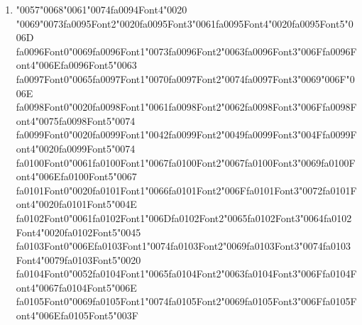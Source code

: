 \documentclass[11pt]{article}
\begin{document}
\begin{enumerate}[label=Q\arabic*., leftmargin=*]
\textbf{A.} Part-of-speech tagging

\textbf{B.} Named Entity Recognition

\textbf{C.} Dependency parsing

\textbf{D.} Sentiment analysis

\item {\char"0057}{\char"0068}{\char"0061}{\char"0074}{\csname fa0094Font4\endcsname\char"0020} {\char"0069}{\char"0073}{\csname fa0095Font2\endcsname\char"0020}{\csname fa0095Font3\endcsname\char"0061}{\csname fa0095Font4\endcsname\char"0020}{\csname fa0095Font5\endcsname\char"006D} {\csname fa0096Font0\endcsname\char"0069}{\csname fa0096Font1\endcsname\char"0073}{\csname fa0096Font2\endcsname\char"0063}{\csname fa0096Font3\endcsname\char"006F}{\csname fa0096Font4\endcsname\char"006E}{\csname fa0096Font5\endcsname\char"0063} {\csname fa0097Font0\endcsname\char"0065}{\csname fa0097Font1\endcsname\char"0070}{\csname fa0097Font2\endcsname\char"0074}{\csname fa0097Font3\endcsname\char"0069}{\char"006F}{\char"006E} {\csname fa0098Font0\endcsname\char"0020}{\csname fa0098Font1\endcsname\char"0061}{\csname fa0098Font2\endcsname\char"0062}{\csname fa0098Font3\endcsname\char"006F}{\csname fa0098Font4\endcsname\char"0075}{\csname fa0098Font5\endcsname\char"0074} {\csname fa0099Font0\endcsname\char"0020}{\csname fa0099Font1\endcsname\char"0042}{\csname fa0099Font2\endcsname\char"0049}{\csname fa0099Font3\endcsname\char"004F}{\csname fa0099Font4\endcsname\char"0020}{\csname fa0099Font5\endcsname\char"0074} {\csname fa0100Font0\endcsname\char"0061}{\csname fa0100Font1\endcsname\char"0067}{\csname fa0100Font2\endcsname\char"0067}{\csname fa0100Font3\endcsname\char"0069}{\csname fa0100Font4\endcsname\char"006E}{\csname fa0100Font5\endcsname\char"0067} {\csname fa0101Font0\endcsname\char"0020}{\csname fa0101Font1\endcsname\char"0066}{\csname fa0101Font2\endcsname\char"006F}{\csname fa0101Font3\endcsname\char"0072}{\csname fa0101Font4\endcsname\char"0020}{\csname fa0101Font5\endcsname\char"004E} {\csname fa0102Font0\endcsname\char"0061}{\csname fa0102Font1\endcsname\char"006D}{\csname fa0102Font2\endcsname\char"0065}{\csname fa0102Font3\endcsname\char"0064}{\csname fa0102Font4\endcsname\char"0020}{\csname fa0102Font5\endcsname\char"0045} {\csname fa0103Font0\endcsname\char"006E}{\csname fa0103Font1\endcsname\char"0074}{\csname fa0103Font2\endcsname\char"0069}{\csname fa0103Font3\endcsname\char"0074}{\csname fa0103Font4\endcsname\char"0079}{\csname fa0103Font5\endcsname\char"0020} {\csname fa0104Font0\endcsname\char"0052}{\csname fa0104Font1\endcsname\char"0065}{\csname fa0104Font2\endcsname\char"0063}{\csname fa0104Font3\endcsname\char"006F}{\csname fa0104Font4\endcsname\char"0067}{\csname fa0104Font5\endcsname\char"006E} {\csname fa0105Font0\endcsname\char"0069}{\csname fa0105Font1\endcsname\char"0074}{\csname fa0105Font2\endcsname\char"0069}{\csname fa0105Font3\endcsname\char"006F}{\csname fa0105Font4\endcsname\char"006E}{\csname fa0105Font5\endcsname\char"003F}


\end{enumerate}
\end{document}
